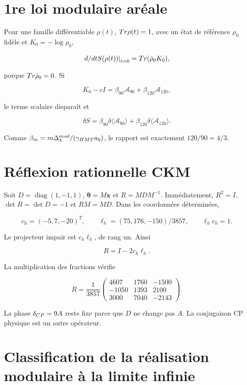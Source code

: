 \section{1re loi modulaire aréale}

Pour une famille différentiable \(\rho(t)\), \(Tr\rho(t)=1\), avec un état de référence \(\rho_0\) fidèle et \(K_0=-\log\rho_0\),

\[
\left.d/dtS(\rho(t))\right|_{t=0}
=Tr(\dot\rho_0K_0),
\]

porque \(Tr\dot\rho_0=0\). Si

\[
K_0-cI=\beta_{90}\mathcal A_{90}
+\beta_{120}\mathcal A_{120},
\]

le terme scalaire disparaît et

\[
\delta S=\beta_{90}\delta\langle\mathcal A_{90}\rangle
+\beta_{120}\delta\langle\mathcal A_{120}\rangle.
\]

Comme \(\beta_m=m\Delta_{4}^{mod}/(\gamma_{HMT} a_0)\), le rapport est exactement \(120/90=4/3\).

\section{Réflexion rationnelle CKM}

Soit \(D=\operatorname{diag}(1,-1,1)\), \(\boldsymbol\theta=M\mathbf x\) et
\(R=MDM^{-1}\). Immédiatement, \(R^2=I\), \(\det R=\det D=-1\) et
\(RM=MD\). Dans les coordonnées déterminées,

\[
c_h=(-5,7,-20)^T,\qquad
\ell_h=(75,176,-150)/3857,\qquad \ell_hc_h=1.
\]

Le projecteur impair est \(c_h\ell_h\), de rang un. Ainsi

\[
R=I-2c_h\ell_h.
\]

La multiplication des fractions vérifie

\[
R=\frac1{3857}
\begin{pmatrix}
4607&1760&-1500\\
-1050&1393&2100\\
3000&7040&-2143
\end{pmatrix}.
\]

La phase \(\delta_{\rm CP}=9A\) reste fixe parce que \(D\) ne change pas \(A\). La conjugaison CP physique est un autre opérateur.

\section{Classification de la réalisation modulaire à la limite infinie}

